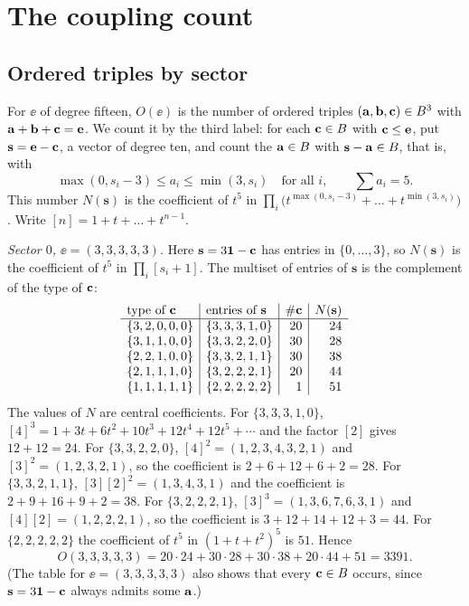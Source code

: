 \section{The coupling count}\label{app:count}

\subsection{Ordered triples by sector}

For $\ee$ of degree fifteen, $O(\ee)$ is the number of ordered triples
$(\mathbf{a},\mathbf{b},\mathbf{c})\in B^3$ with $\mathbf{a}+\mathbf{b}+\mathbf{c}=\mathbf{e}$. We count it by the third
label: for each $\mathbf{c}\in B$ with $\mathbf{c}\le\mathbf{e}$, put $\mathbf s=\mathbf{e}-\mathbf{c}$, a
vector of degree ten, and count the $\mathbf{a}\in B$ with $\mathbf s-\mathbf{a}\in B$,
that is, with
\[
\max(0,s_i-3)\le a_i\le\min(3,s_i)\quad\text{for all }i,\qquad
\textstyle\sum a_i=5.
\]
This number $N(\mathbf s)$ is the coefficient of $t^5$ in
$\prod_i\big(t^{\max(0,s_i-3)}+\dots+t^{\min(3,s_i)}\big)$. Write
$[n]=1+t+\dots+t^{n-1}$.

\emph{Sector $0$, $\ee=(3,3,3,3,3)$.} Here $\mathbf s=3\mathbf{1}-\mathbf{c}$ has
entries in $\{0,\dots,3\}$, so $N(\mathbf s)$ is the coefficient of $t^5$ in
$\prod_i[s_i+1]$. The multiset of entries of $\mathbf s$ is the complement
of the type of $\mathbf{c}$:
\[
\begin{array}{l|l|r|r}
\text{type of }\mathbf{c}&\text{entries of }\mathbf s&\#\mathbf{c}&N(\mathbf s)\\\hline
\{3,2,0,0,0\}&\{3,3,3,1,0\}&20&24\\
\{3,1,1,0,0\}&\{3,3,2,2,0\}&30&28\\
\{2,2,1,0,0\}&\{3,3,2,1,1\}&30&38\\
\{2,1,1,1,0\}&\{3,2,2,2,1\}&20&44\\
\{1,1,1,1,1\}&\{2,2,2,2,2\}&1&51
\end{array}
\]
The values of $N$ are central coefficients. For $\{3,3,3,1,0\}$,
$[4]^3=1+3t+6t^2+10t^3+12t^4+12t^5+\cdots$ and the factor $[2]$ gives
$12+12=24$. For $\{3,3,2,2,0\}$, $[4]^2=(1,2,3,4,3,2,1)$ and
$[3]^2=(1,2,3,2,1)$, so the coefficient is $2+6+12+6+2=28$. For
$\{3,3,2,1,1\}$, $[3][2]^2=(1,3,4,3,1)$ and the coefficient is
$2+9+16+9+2=38$. For $\{3,2,2,2,1\}$, $[3]^3=(1,3,6,7,6,3,1)$ and
$[4][2]=(1,2,2,2,1)$, so the coefficient is $3+12+14+12+3=44$. For
$\{2,2,2,2,2\}$ the coefficient of $t^5$ in $(1+t+t^2)^5$ is $51$. Hence
\[
O(3,3,3,3,3)=20\cdot24+30\cdot28+30\cdot38+20\cdot44+51=3391.
\]
(The table for $\ee=(3,3,3,3,3)$ also shows that every $\mathbf{c}\in B$ occurs,
since $\mathbf s=3\mathbf{1}-\mathbf{c}$ always admits some $\mathbf{a}$.)

